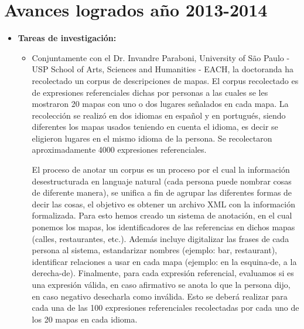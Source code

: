 \section{Avances logrados a\~no 2013-2014 }
\label{progreso}

\begin{itemize}
\item \textbf{Tareas de investigaci\'on:}
\begin{itemize}

\item Conjuntamente con el Dr. Invandre Paraboni, University of S\~ao Paulo - USP 
School of Arts, Sciences and Humanities - EACH, la doctoranda ha recolectado un corpus de descripciones de mapas. El corpus recolectado es de expresiones referenciales dichas por personas a las cuales se les mostraron 20 mapas con uno o dos lugares se\~nalados en cada mapa. La recolecci\'on se realiz\'o en dos idiomas en espa\~nol y en portugu\'es, siendo diferentes los mapas usados teniendo en cuenta el idioma, es decir se eligieron lugares en el mismo idioma de la persona. Se recolectaron aproximadamente 4000 expresiones referenciales. 

El proceso de anotar un corpus es un proceso por el cual la informaci\'on desestructurada en languaje natural (cada persona puede nombrar cosas de diferente manera), se unifica a fin de agrupar las diferentes formas de decir las cosas, el objetivo es obtener un archivo XML con la informaci\'on formalizada.
Para esto hemos creado un sistema de anotaci\'on, en el cual ponemos los mapas, los identificadores de las referencias en dichos mapas (calles, restaurantes, etc.). Además incluye digitalizar las frases de cada persona al sistema, estandarizar nombres (ejemplo: bar, restaurant), identificar relaciones a usar en cada mapa (ejemplo: en la esquina-de, a la derecha-de). Finalmente, para cada expresi\'on referencial, evaluamos si es una expresi\'on v\'alida, en caso afirmativo se anota lo que la persona dijo, en caso negativo desecharla como inv\'alida. Esto se deber\'a realizar para cada una de las 100 expresiones referenciales recolectadas por cada uno de los 20 mapas en cada idioma.
 

\end{itemize}
\end{itemize}
